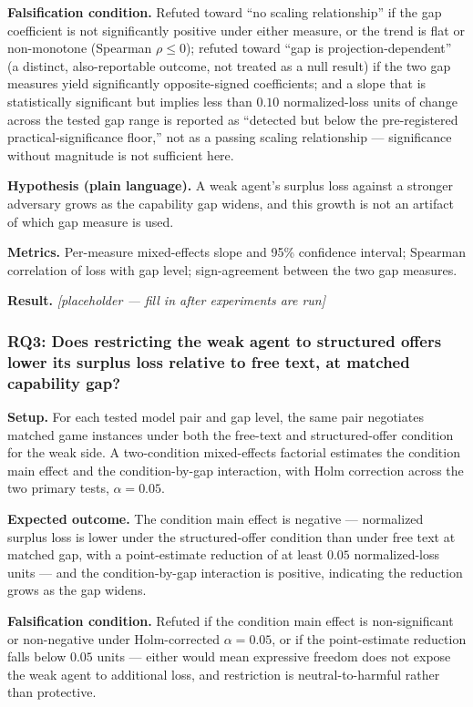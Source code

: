 \documentclass[11pt]{article}
\newcommand{\ph}{\textit{[placeholder --- fill in after experiments are run]}}
\begin{document}
\textbf{Falsification condition.} Refuted toward ``no scaling relationship'' if the gap coefficient is not significantly positive under either measure, or the trend is flat or non-monotone (Spearman $\rho \leq 0$); refuted toward ``gap is projection-dependent'' (a distinct, also-reportable outcome, not treated as a null result) if the two gap measures yield significantly opposite-signed coefficients; and a slope that is statistically significant but implies less than $0.10$ normalized-loss units of change across the tested gap range is reported as ``detected but below the pre-registered practical-significance floor,'' not as a passing scaling relationship --- significance without magnitude is not sufficient here.

\textbf{Hypothesis (plain language).} A weak agent's surplus loss against a stronger adversary grows as the capability gap widens, and this growth is not an artifact of which gap measure is used.

\textbf{Metrics.} Per-measure mixed-effects slope and 95\% confidence interval; Spearman correlation of loss with gap level; sign-agreement between the two gap measures.

\textbf{Result.} \ph

\subsubsection{RQ3: Does restricting the weak agent to structured offers lower its surplus loss relative to free text, at matched capability gap?}
\textbf{Setup.} For each tested model pair and gap level, the same pair negotiates matched game instances under both the free-text and structured-offer condition for the weak side. A two-condition mixed-effects factorial estimates the condition main effect and the condition-by-gap interaction, with Holm correction across the two primary tests, $\alpha = 0.05$.

\textbf{Expected outcome.} The condition main effect is negative --- normalized surplus loss is lower under the structured-offer condition than under free text at matched gap, with a point-estimate reduction of at least $0.05$ normalized-loss units --- and the condition-by-gap interaction is positive, indicating the reduction grows as the gap widens.

\textbf{Falsification condition.} Refuted if the condition main effect is non-significant or non-negative under Holm-corrected $\alpha = 0.05$, or if the point-estimate reduction falls below $0.05$ units --- either would mean expressive freedom does not expose the weak agent to additional loss, and restriction is neutral-to-harmful rather than protective.
\end{document}
